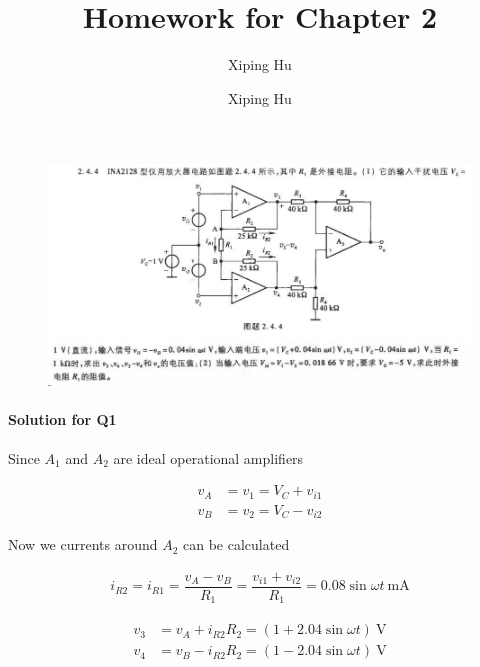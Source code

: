 \documentclass{article}
\author{Xiping Hu}
\author{Xiping Hu}
\affil{http://thehxp.tech/}
\title{Homework for Chapter 2}
\begin{document}
\maketitle

\begin{figure}[H]
  \centering
  \includegraphics[width=\linewidth]{figures/Problem3-1}
  \label{fig:}
\end{figure}

\paragraph{Solution for Q1}

Since $A_1$ and $A_2$ are ideal operational amplifiers

\begin{equation*}
  \begin{aligned}
    v_A &= v_1 = V_C + v_{i1} \\
    v_B &= v_2 = V_C - v_{i2}
  \end{aligned}
\end{equation*}

Now we currents around $A_2$ can be calculated

\begin{equation*}
  \begin{aligned}
    i_{R2} = i_{R1} = \dfrac{v_A - v_B}{R_1} = \dfrac{v_{i1} + v_{i2}}{R_1} = 0.08 \sin \omega t \  \mathrm{mA}
  \end{aligned}
\end{equation*}



\begin{equation*}
  \begin{aligned}
    v_3 &= v_A + i_{R2} R_2 = \left( 1 + 2.04 \sin \omega t \right) \  \mathrm{V} \\
    v_4 &= v_B - i_{R2} R_2 = \left( 1 - 2.04 \sin \omega t \right) \  \mathrm{V}
  \end{aligned}
\end{equation*}
\end{document}
